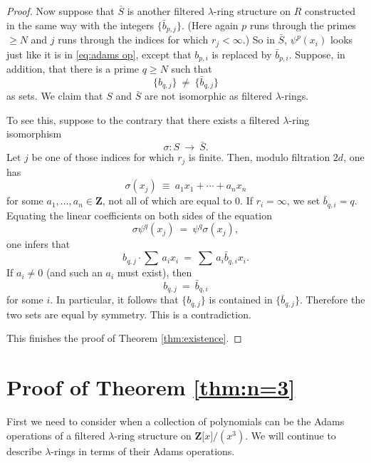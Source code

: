 \documentclass[reqno,11pt]{amsart}
\numberwithin{equation}{subsection}  %
\newcommand{\bZ}{\mathbf{Z}}
\begin{document}
\begin{proof}
Now suppose that $\bar{S}$ is another filtered $\lambda$-ring structure on $R$ constructed in the same way with the integers $\lbrace \bar{b}_{p,j}\rbrace$.  (Here again $p$ runs through the primes $\geq N$ and $j$ runs through the indices for which $r_j < \infty$.)  So in $\bar{S}$, $\psi^p(x_i)$ looks just like it is in \eqref{eq:adams op}, except that $b_{p,i}$ is replaced by $\bar{b}_{p,i}$.  Suppose, in addition, that there is a prime $q \geq N$ such that
   \[
   \lbrace b_{q,j} \rbrace
   ~\not= ~ \lbrace \bar{b}_{q,j} \rbrace
   \]
as sets.  We claim that $S$ and $\bar{S}$ are not isomorphic as filtered $\lambda$-rings.  


To see this, suppose to the contrary that there exists a filtered $\lambda$-ring isomorphism
   \[
   \sigma \colon S ~\to~ \bar{S}.
   \]
Let $j$ be one of those indices for which $r_j$ is finite.  Then, modulo filtration $2d$, one has
   \[
   \sigma(x_j) ~\equiv~ a_1 x_1 + \cdots + a_n x_n
   \]
for some $a_1, \ldots, a_n \in \bZ$, not all of which are equal to $0$.  If $r_i = \infty$, we set $\bar{b}_{q,i} = q$.  Equating the linear coefficients on both sides of the equation
   \[
   \sigma \psi^q(x_j) ~=~ \psi^q \sigma(x_j),
   \]
one infers that
   \[
   b_{q,j}\cdot \sum\, a_i x_i 
   ~=~ \sum \, a_i \bar{b}_{q,i}x_i.
   \]
If $a_i \not= 0$ (and such an $a_i$ must exist), then
   \[
   b_{q,j} ~=~ \bar{b}_{q,i}
   \]
for some $i$.  In particular, it follows that $\lbrace b_{q,j} \rbrace$ is contained in $\lbrace \bar{b}_{q,j} \rbrace$.  Therefore the two sets are equal by symmetry.  This is a contradiction.


This finishes the proof of Theorem \ref{thm:existence}.
\end{proof}



\section{Proof of Theorem \ref{thm:n=3}}
\label{sec:n=3}

First we need to consider when a collection of polynomials can be the Adams operations of a filtered $\lambda$-ring structure on $\bZ \lbrack x \rbrack/(x^3)$.  We will continue to describe $\lambda$-rings in terms of their Adams operations.
\end{document}

